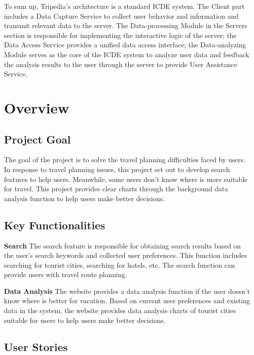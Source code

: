 \documentclass[conference]{IEEEtran}
\begin{document}
To sum up, Tripedia's architecture is a standard ICDE system. The Client part includes a Data Capture Service to collect user behavior and information and transmit relevant data to the server. The Data-processing Module in the Servers section is responsible for implementing the interactive logic of the server; the Data Access Service provides a unified data access interface; the Data-analyzing Module serves as the core of the ICDE system to analyze user data and feedback the analysis results to the user through the server to provide User Assistance Service.

\section{Overview}


\subsection{Project Goal}

The goal of the project is to solve the travel planning difficulties faced by users. In response to travel planning issues, this project set out to develop search features to help users. Meanwhile, some users don’t know where is more suitable for travel. This project provides clear charts through the background data analysis function to help users make better decisions. 

\subsection{Key Functionalities}

\textbf{Search} The search feature is responsible for obtaining search results based on the user's search keywords and collected user preferences. This function includes searching for tourist cities, searching for hotels, etc. The search function can provide users with travel route planning.

\textbf{Data Analysis} The website provides a data analysis function if the user doesn't know where is better for vacation. Based on current user preferences and existing data in the system, the website provides data analysis charts of tourist cities suitable for users to help users make better decisions.

\subsection{User Stories}
\end{document}
